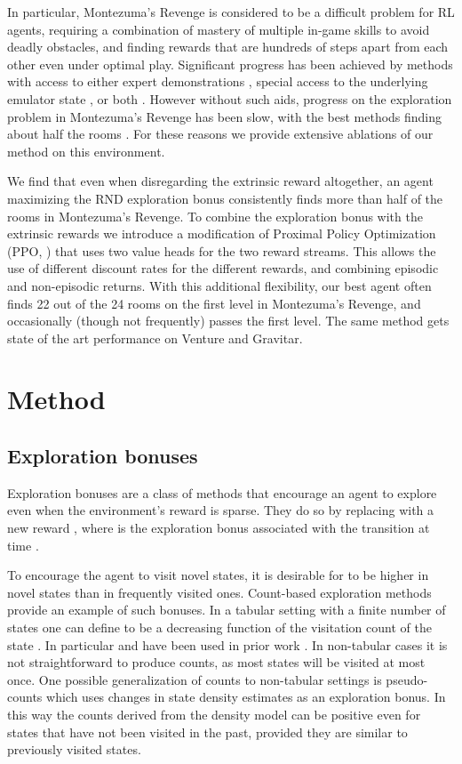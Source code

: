 \documentclass{article} \usepackage[dvipsnames]{xcolor}
\begin{document}
In particular, Montezuma's Revenge is considered to be a difficult problem for RL agents, requiring a combination of mastery of multiple in-game skills to avoid deadly obstacles, and finding rewards that are hundreds of steps apart from each other even under optimal play. Significant progress has been achieved by methods with access to either expert demonstrations \citep{pohlen2018observe,aytar2018playing,garmulewicz2018expert}, special access to the underlying emulator state \citep{tang2016exploration,stanton2018deep}, or both \citep{salimans2018mz}. However without such aids, progress on the exploration problem in Montezuma's Revenge has been slow, with the best methods finding about half the rooms \citep{bellemare2016unifying}. For these reasons we provide extensive ablations of our method on this environment.

We find that even when disregarding the extrinsic reward altogether, an agent maximizing the RND exploration bonus consistently finds more than half of the rooms in Montezuma's Revenge. To combine the exploration bonus with the extrinsic rewards we introduce a modification of Proximal Policy Optimization (PPO, \cite{ppo}) that uses two value heads for the two reward streams. This allows the use of different discount rates for the different rewards, and combining episodic and non-episodic returns. With this additional flexibility, our best agent often finds 22 out of the 24 rooms on the first level in Montezuma's Revenge, and occasionally (though not frequently) passes the first level. The same method gets state of the art performance on Venture and Gravitar.
\section{Method}
\subsection{Exploration bonuses}
\label{sec:method}
Exploration bonuses are a class of methods that encourage an agent to explore even when the environment's reward  is sparse. They do so by replacing  with a new reward , where  is the exploration bonus associated with the transition at time .

To encourage the agent to visit novel states, it is desirable for  to be higher in novel states than in frequently visited ones. Count-based exploration methods provide an example of such bonuses. In a tabular setting with a finite number of states one can define  to be a decreasing function of the visitation count  of the state . In particular  and  have been used in prior work \citep{bellemare2016unifying, neuralcount}. In non-tabular cases it is not straightforward to produce counts, as most states will be visited at most once. One possible generalization of counts to non-tabular settings is pseudo-counts \citep{bellemare2016unifying} which uses changes in state density estimates as an exploration bonus. In this way the counts derived from the density model can be positive even for states that have not been visited in the past, provided they are similar to previously visited states.
\end{document}
